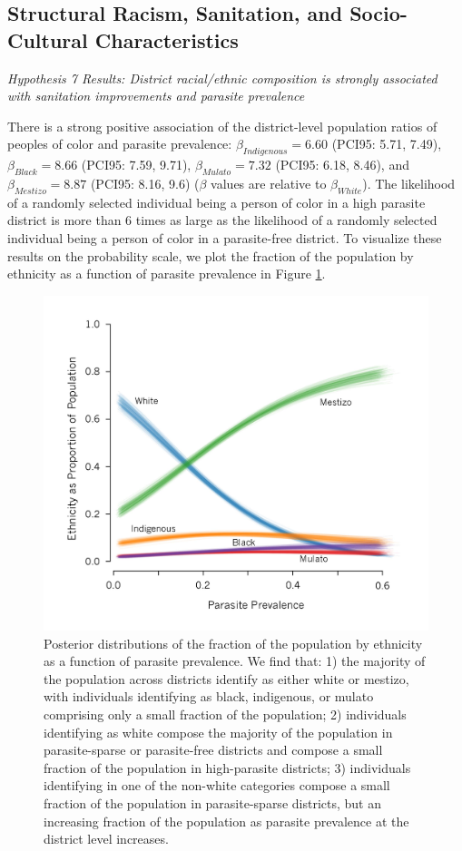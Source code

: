 \documentclass[12pt]{article}
\begin{document}
\subsection{Structural Racism, Sanitation, and Socio-Cultural Characteristics}
\noindent\textit{Hypothesis 7 Results: District racial/ethnic composition is strongly associated with sanitation improvements and parasite prevalence}

	There is a strong positive association of the district-level population ratios of peoples of color and parasite prevalence: $\beta_{Indigenous}=6.60$ (PCI95: 5.71, 7.49), $\beta_{Black}=8.66$ (PCI95: 7.59, 9.71), $\beta_{Mulato}=7.32$ (PCI95: 6.18, 8.46), and $\beta_{Mestizo}=8.87$ (PCI95: 8.16,  9.6) ($\beta$ values are relative to $\beta_{White}$). The likelihood of a randomly selected individual being a person of color in a high parasite district is more than 6 times as large as the likelihood of a randomly selected individual being a person of color in a parasite-free district. To visualize these results on the probability scale, we plot the fraction of the population by ethnicity as a function of parasite prevalence in Figure \ref{resStructRacism}.\\

 \begin{figure}
\caption{\label{resStructRacism}  Posterior distributions of the fraction of the population by ethnicity as a function of parasite prevalence. We find that: 1) the majority of the population across districts identify as either white or mestizo, with individuals identifying as black, indigenous, or mulato comprising only a small fraction of the population; 2) individuals identifying as white compose the majority of the population in parasite-sparse or parasite-free districts and compose a small fraction of the population in high-parasite districts; 3) individuals identifying in one of the non-white categories compose a small fraction of the population in parasite-sparse districts, but an increasing fraction of the population as parasite prevalence at the district level increases.}
\includegraphics[width=5in]{Figures/StructuralRacismModel} 
\end{figure}
\end{document}
